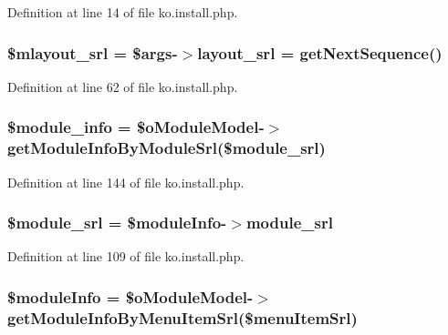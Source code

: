 Definition at line 14 of file ko.\+install.\+php.

\hypertarget{ko_8install_8php_a576210f0eec2e42df2c40e04a3972bb0}{
\subsubsection[{\$mlayout\+\_\+srl}]{\setlength{\rightskip}{0pt plus 5cm}\${\bf mlayout\+\_\+srl} = \$args-\/$>${\bf layout\+\_\+srl} = {\bf get\+Next\+Sequence}()}}\label{ko_8install_8php_a576210f0eec2e42df2c40e04a3972bb0}


Definition at line 62 of file ko.\+install.\+php.

\hypertarget{ko_8install_8php_a5e701819149f6ea0893d4b79010417d3}{
\subsubsection[{\$module\+\_\+info}]{\setlength{\rightskip}{0pt plus 5cm}\$module\+\_\+info = \$o\+Module\+Model-\/$>$get\+Module\+Info\+By\+Module\+Srl(\${\bf module\+\_\+srl})}}\label{ko_8install_8php_a5e701819149f6ea0893d4b79010417d3}


Definition at line 144 of file ko.\+install.\+php.

\hypertarget{ko_8install_8php_ae40aed4d7a99050245e66ca2a82949ed}{
\subsubsection[{\$module\+\_\+srl}]{\setlength{\rightskip}{0pt plus 5cm}\${\bf module\+\_\+srl} = \$module\+Info-\/$>${\bf module\+\_\+srl}}}\label{ko_8install_8php_ae40aed4d7a99050245e66ca2a82949ed}


Definition at line 109 of file ko.\+install.\+php.

\hypertarget{ko_8install_8php_ae3552a6dd49f37a50e7858151f7c5cc2}{
\subsubsection[{\$module\+Info}]{\setlength{\rightskip}{0pt plus 5cm}\$module\+Info = \$o\+Module\+Model-\/$>$get\+Module\+Info\+By\+Menu\+Item\+Srl(\$menu\+Item\+Srl)}}\label{ko_8install_8php_ae3552a6dd49f37a50e7858151f7c5cc2}


